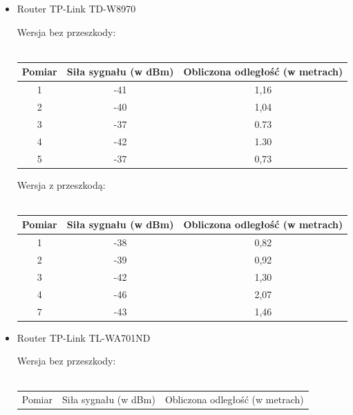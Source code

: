 \documentclass{article}
\begin{document}
			\begin{itemize}
				\item Router TP-Link TD-W8970
				\begin{center}
					\begin{minipage}{\linewidth}
					Wersja bez przeszkody:\\\\
					\begin{tabular}{|c|c|c|}
						\hline 
						Pomiar & Siła sygnału (w dBm) & Obliczona odległość (w metrach) \\ 
						\hline 
						1 & -41 & 1,16 \\ 
						\hline 
						2 & -40 & 1,04 \\ 
						\hline 
						3 & -37 & 0.73 \\ 
						\hline 
						4 & -42 & 1.30 \\ 
						\hline 
						5 & -37 & 0,73 \\ 
						\hline 
					\end{tabular} 
				\end{minipage} 
				\end{center}
				\begin{center}
					\begin{minipage}{\linewidth}
						Wersja z przeszkodą:\\\\
					\begin{tabular}{|c|c|c|}
						\hline 
						Pomiar & Siła sygnału (w dBm) & Obliczona odległość (w metrach) \\ 
						\hline 
						1 & -38 & 0,82 \\ 
						\hline 
						2 & -39 & 0,92 \\ 
						\hline 
						3 & -42 & 1,30 \\ 
						\hline 
						4 & -46 & 2,07 \\ 
						\hline 
						7 & -43 & 1,46 \\ 
						\hline 
					\end{tabular}				
					\end{minipage} 
				\end{center}
			\item Router TP-Link TL-WA701ND
			\begin{center}
				\begin{minipage}{\linewidth}
					Wersja bez przeszkody:\\\\
					\begin{tabular}{|c|c|c|}
						\hline 
						Pomiar & Siła sygnału (w dBm) & Obliczona odległość (w metrach) \\ 

\end{tabular}
\end{minipage}
\end{center}
\end{itemize}
\end{document}
